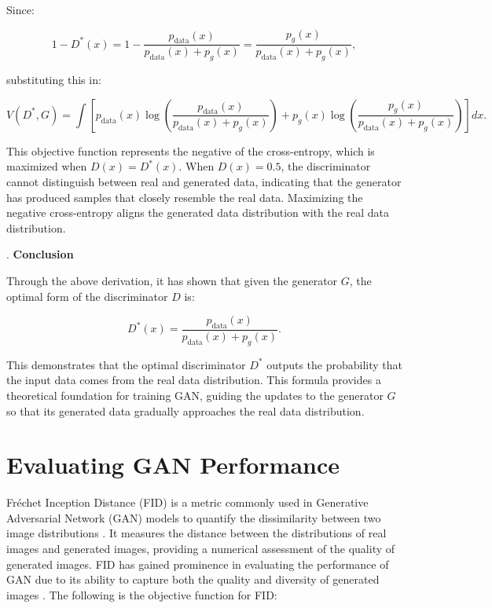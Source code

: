 Since:

\begin{equation}
    1 - D^*(x) = 1 - \frac{p_{\text{data}}(x)}{p_{\text{data}}(x) + p_g(x)} = \frac{p_g(x)}{p_{\text{data}}(x) + p_g(x)},
\end{equation}

substituting this in:

\begin{equation}
    V(D^*, G) = \int \left[ p_{\text{data}}(x) \log \left( \frac{p_{\text{data}}(x)}{p_{\text{data}}(x) + p_g(x)} \right) + p_g(x) \log \left( \frac{p_g(x)}{p_{\text{data}}(x) + p_g(x)} \right) \right] dx.
\end{equation}

This objective function represents the negative of the cross-entropy, which is maximized when $D(x) = D^*(x)$. When $D(x) = 0.5$, the discriminator cannot distinguish between real and generated data, indicating that the generator has produced samples that closely resemble the real data. Maximizing the negative cross-entropy aligns the generated data distribution with the real data distribution.

. \textbf{Conclusion}

Through the above derivation, it has shown that given the generator \( G \), the optimal form of the discriminator \( D \) is:

\begin{equation}
    D^*(x) = \frac{p_{\text{data}}(x)}{p_{\text{data}}(x) + p_g(x)}.
\end{equation}

This demonstrates that the optimal discriminator \( D^* \) outputs the probability that the input data comes from the 
real data distribution. 
This formula provides a theoretical foundation for training GAN, guiding the updates to the generator \( G \) so that 
its generated data gradually approaches the real data distribution.


\section{Evaluating GAN Performance}

Fréchet Inception Distance (FID) is a metric commonly used in Generative Adversarial Network (GAN) models 
to quantify the dissimilarity between two image distributions \citep{10.48550/arxiv.2203.06026}. 
It measures the distance between the distributions of real images and generated images, providing 
a numerical assessment of the quality of generated images. FID has gained prominence in evaluating 
the performance of GAN due to its ability to capture both the quality and diversity of generated images \citep{10.3390/app12157599}.
The following is the objective function for FID:

